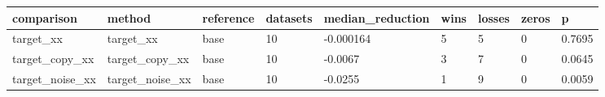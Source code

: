 \begin{tabular}{lllllllll}
\toprule
comparison & method & reference & datasets & median\_reduction & wins & losses & zeros & p \\
\midrule
target\_xx & target\_xx & base & 10 & -0.000164 & 5 & 5 & 0 & 0.7695 \\
target\_copy\_xx & target\_copy\_xx & base & 10 & -0.0067 & 3 & 7 & 0 & 0.0645 \\
target\_noise\_xx & target\_noise\_xx & base & 10 & -0.0255 & 1 & 9 & 0 & 0.0059 \\
\bottomrule
\end{tabular}
